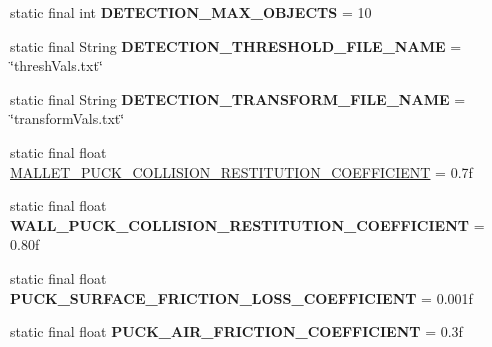 \begin{DoxyCompactItemize}
\item 
\hypertarget{classairhockeyjava_1_1game_1_1_constants_a2a01f3df856da24ec5b2c1ae80e6f0c8}{}static final int {\bfseries D\+E\+T\+E\+C\+T\+I\+O\+N\+\_\+\+M\+A\+X\+\_\+\+O\+B\+J\+E\+C\+T\+S} = 10\label{classairhockeyjava_1_1game_1_1_constants_a2a01f3df856da24ec5b2c1ae80e6f0c8}

\item 
\hypertarget{classairhockeyjava_1_1game_1_1_constants_a23c84153c74be680120fb059a6f56cb7}{}static final String {\bfseries D\+E\+T\+E\+C\+T\+I\+O\+N\+\_\+\+T\+H\+R\+E\+S\+H\+O\+L\+D\+\_\+\+F\+I\+L\+E\+\_\+\+N\+A\+M\+E} = \char`\"{}thresh\+Vals.\+txt\char`\"{}\label{classairhockeyjava_1_1game_1_1_constants_a23c84153c74be680120fb059a6f56cb7}

\item 
\hypertarget{classairhockeyjava_1_1game_1_1_constants_adf8c3c901a00563b4a5e5b116343f7d9}{}static final String {\bfseries D\+E\+T\+E\+C\+T\+I\+O\+N\+\_\+\+T\+R\+A\+N\+S\+F\+O\+R\+M\+\_\+\+F\+I\+L\+E\+\_\+\+N\+A\+M\+E} = \char`\"{}transform\+Vals.\+txt\char`\"{}\label{classairhockeyjava_1_1game_1_1_constants_adf8c3c901a00563b4a5e5b116343f7d9}

\item 
static final float \hyperlink{classairhockeyjava_1_1game_1_1_constants_a54d60619f9350a5186141786f3b53ef4}{M\+A\+L\+L\+E\+T\+\_\+\+P\+U\+C\+K\+\_\+\+C\+O\+L\+L\+I\+S\+I\+O\+N\+\_\+\+R\+E\+S\+T\+I\+T\+U\+T\+I\+O\+N\+\_\+\+C\+O\+E\+F\+F\+I\+C\+I\+E\+N\+T} = 0.\+7f
\item 
\hypertarget{classairhockeyjava_1_1game_1_1_constants_a52d7739b7aae7305bc67720457e9a0b8}{}static final float {\bfseries W\+A\+L\+L\+\_\+\+P\+U\+C\+K\+\_\+\+C\+O\+L\+L\+I\+S\+I\+O\+N\+\_\+\+R\+E\+S\+T\+I\+T\+U\+T\+I\+O\+N\+\_\+\+C\+O\+E\+F\+F\+I\+C\+I\+E\+N\+T} = 0.\+80f\label{classairhockeyjava_1_1game_1_1_constants_a52d7739b7aae7305bc67720457e9a0b8}

\item 
\hypertarget{classairhockeyjava_1_1game_1_1_constants_a2e4377b1293e51a576110208bcdc8dcf}{}static final float {\bfseries P\+U\+C\+K\+\_\+\+S\+U\+R\+F\+A\+C\+E\+\_\+\+F\+R\+I\+C\+T\+I\+O\+N\+\_\+\+L\+O\+S\+S\+\_\+\+C\+O\+E\+F\+F\+I\+C\+I\+E\+N\+T} = 0.\+001f\label{classairhockeyjava_1_1game_1_1_constants_a2e4377b1293e51a576110208bcdc8dcf}

\item 
\hypertarget{classairhockeyjava_1_1game_1_1_constants_a7fb147ea974d86a6af10e759231bfedd}{}static final float {\bfseries P\+U\+C\+K\+\_\+\+A\+I\+R\+\_\+\+F\+R\+I\+C\+T\+I\+O\+N\+\_\+\+C\+O\+E\+F\+F\+I\+C\+I\+E\+N\+T} = 0.\+3f\label{classairhockeyjava_1_1game_1_1_constants_a7fb147ea974d86a6af10e759231bfedd}


\end{DoxyCompactItemize}
